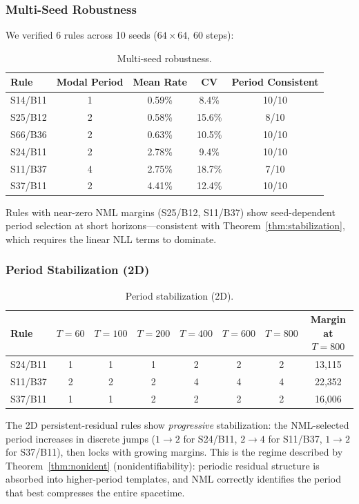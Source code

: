 \documentclass[11pt]{article}
\theoremstyle{definition}
\theoremstyle{remark}
\begin{document}
\subsubsection{Multi-Seed Robustness}

We verified 6 rules across 10 seeds ($64 \times 64$, 60 steps):

\begin{table}[h]
\centering
\caption{Multi-seed robustness.}
\begin{tabular}{lcccc}
\toprule
Rule & Modal Period & Mean Rate & CV & Period Consistent \\
\midrule
S14/B11 & 1 & 0.59\% & 8.4\%  & 10/10 \\
S25/B12 & 2 & 0.58\% & 15.6\% & 8/10 \\
S66/B36 & 2 & 0.63\% & 10.5\% & 10/10 \\
S24/B11 & 2 & 2.78\% & 9.4\%  & 10/10 \\
S11/B37 & 4 & 2.75\% & 18.7\% & 7/10 \\
S37/B11 & 2 & 4.41\% & 12.4\% & 10/10 \\
\bottomrule
\end{tabular}
\end{table}

Rules with near-zero NML margins (S25/B12, S11/B37) show seed-dependent period selection at short horizons---consistent with Theorem~\ref{thm:stabilization}, which requires the linear NLL terms to dominate.

\subsubsection{Period Stabilization (2D)}

\begin{table}[h]
\centering
\caption{Period stabilization (2D).}
\begin{tabular}{lccccccc}
\toprule
Rule & $T{=}60$ & $T{=}100$ & $T{=}200$ & $T{=}400$ & $T{=}600$ & $T{=}800$ & Margin at $T{=}800$ \\
\midrule
S24/B11 & 1 & 1 & 1 & 2 & 2 & 2 & 13{,}115 \\
S11/B37 & 2 & 2 & 2 & 4 & 4 & 4 & 22{,}352 \\
S37/B11 & 1 & 1 & 2 & 2 & 2 & 2 & 16{,}006 \\
\bottomrule
\end{tabular}
\end{table}

The 2D persistent-residual rules show \emph{progressive} stabilization: the NML-selected period increases in discrete jumps ($1 \to 2$ for S24/B11, $2 \to 4$ for S11/B37, $1 \to 2$ for S37/B11), then locks with growing margins.
This is the regime described by Theorem~\ref{thm:nonident} (nonidentifiability): periodic residual structure is absorbed into higher-period templates, and NML correctly identifies the period that best compresses the entire spacetime.
\end{document}

